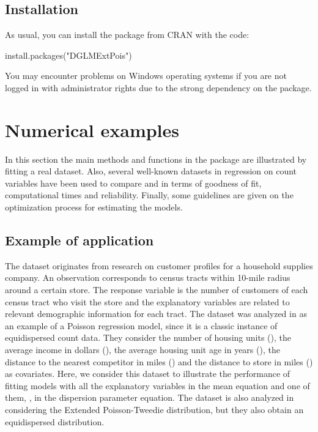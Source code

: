 \subsection{Installation}

As usual, you can install the  package from CRAN with the code:

\begin{example}
install.packages("DGLMExtPois")
\end{example}

You may encounter problems on Windows operating systems if you are not logged in with administrator rights due to the strong dependency on the  package.

\section{Numerical examples}

In this section the main methods and functions in the package are illustrated by fitting a real dataset. Also, several well-known datasets in regression on count variables have been used to compare  and  in terms of goodness of fit, computational times and reliability. Finally, some guidelines are given on the optimization process for estimating the models.

\subsection{Example of application}

The dataset originates from research on customer profiles for a household supplies company. An observation corresponds to census tracts within 10-mile radius around a certain store. The response variable is the number of customers of each census tract who visit the store and the explanatory variables are related to relevant demographic information for each tract. The dataset was analyzed in \citet{Neter1996} as an example of a Poisson regression model, since it is a classic instance of equidispersed count data. They consider the number of housing units (), the average income in dollars (), the average housing unit age in years (), the distance to the nearest competitor in miles () and the distance to store in miles () as covariates. Here, we consider this dataset to illustrate the performance of  fitting models with all the explanatory variables in the mean equation and one of them, , in the dispersion parameter equation. The dataset is also analyzed in \citep{Bonat} considering the Extended Poisson-Tweedie distribution, but they also obtain an equidispersed distribution.

